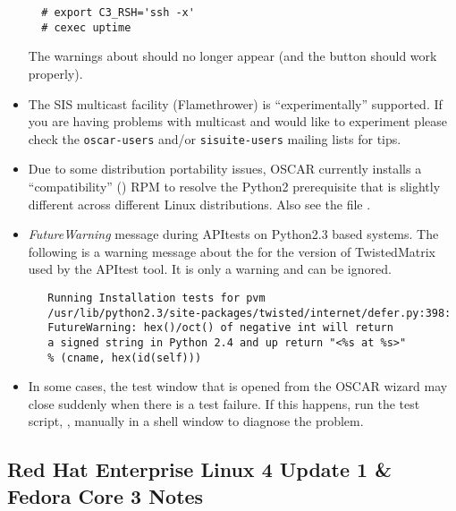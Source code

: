 \begin{itemize}
\begin{verbatim}
  # export C3_RSH='ssh -x'
  # cexec uptime
\end{verbatim}

  The warnings about  should no longer appear (and the
   button should work properly).

\item The SIS multicast facility (Flamethrower) is ``experimentally''
  supported.  If you are having problems with multicast and would like
  to experiment please check the {\tt oscar-users} and/or
  {\tt sisuite-users} mailing lists for tips.

\item Due to some distribution portability issues, OSCAR currently installs
  a ``compatibility''  () RPM to resolve the
  Python2 prerequisite that is slightly different across different Linux
  distributions.  Also see the file .

\item \emph{FutureWarning} message during APItests on Python2.3 based systems.
   The following is a warning message about the for the version of
   TwistedMatrix used by the APItest tool.  It is only a warning and can be
   ignored.
   \begin{small}
   \begin{verbatim}
   Running Installation tests for pvm
   /usr/lib/python2.3/site-packages/twisted/internet/defer.py:398:
   FutureWarning: hex()/oct() of negative int will return
   a signed string in Python 2.4 and up return "<%s at %s>" 
   % (cname, hex(id(self)))
   \end{verbatim}
   \end{small}

\item In some cases, the test window that is opened from the
  OSCAR wizard may close suddenly when there is a test failure. If
  this happens, run the test script, ,
  manually in a shell window to diagnose the problem.

\end{itemize}


\subsection{Red Hat Enterprise Linux 4 Update 1 \& Fedora Core 3 Notes}
\label{subsec:rhel4notes}

